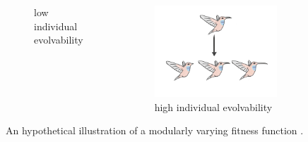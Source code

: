 \begin{figure}
\begin{columns}[T,onlytextwidth]
\begin{minipage}[]{0.45\textwidth}
\begin{subfigure}[b]{\textwidth}
    \caption{low individual evolvability}
  \end{subfigure}%
\end{minipage}%
\begin{minipage}[]{0.45\textwidth}
\begin{subfigure}[b]{\textwidth}
    \centering
  \includegraphics[width=\textwidth]{img/hbird_highevol}
    \caption{high individual evolvability}
  \end{subfigure}
\end{minipage}%
\end{columns}
 
\captionsetup{singlelinecheck=off,justification=raggedright}
  \caption{An hypothetical illustration of a modularly varying fitness function \cite{Kashtan2005SpontaneousMotifs}.}
  \label{fig:hummingbird_selection_pressure}
\end{figure}